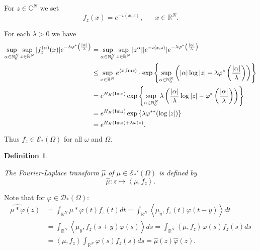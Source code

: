 \documentclass[twoside]{amsart}
\newtheorem{Def}[Th]{Definition}
\begin{document}
For
$z\in\mathbb{C}^{N}$ we set
\[
f_{z}(x)=e^{-i\left\langle x,z\right\rangle },\,\,\,\,\,\,\,\,\,\,x\in{\mathbb R}^N.
\]

For each $\lambda>0$ we have 
\begin{align}
 \sup_{\alpha\in{\mathbb N}_0^N}\sup_{x\in{\mathbb R}^N}
  |f_{z}^{(\alpha)}(x)|e^{-\lambda\varphi^*\left(\frac{|\alpha|}{\lambda}\right)}
  & =\sup_{\alpha\in{\mathbb N}_0^N}\sup_{x\in{\mathbb R}^N}
  |z^{\alpha}|
  |e^{-i\left\langle x,z\right\rangle }|e^{-\lambda\varphi^*\left(\frac{|\alpha|}{\lambda}\right)}
  \nonumber \\
  & \leq\sup_{x\in{\mathbb R}^N}e^{\langle
      x,{\mathop{\rm Im}\nolimits} z\rangle} \cdot\exp\left\{\sup_{\alpha\in{\mathbb N}_{0}^{N}}
      \left(|\alpha|\log|z|-\lambda\varphi^{*}\left(\frac{|\alpha|}{\lambda}
      \right)\right)\right\}\nonumber \\
  & =e^{H_{K}({\mathop{\rm Im}\nolimits} z)}\exp\left\{ \sup_{\alpha\in{\mathbb N}_{0}^{N}}\lambda
  \left(\frac{|\alpha|}{\lambda}\log|z|-\varphi^{*}\left(
  \frac{|\alpha|}{\lambda}\right)\right)\right\} \nonumber \\
 & =e^{H_{K}({\mathop{\rm Im}\nolimits} z)}\exp\left\{ \lambda\varphi^{**}(\log|z|)\right\} \nonumber \\
   & =e^{H_{K}({\mathop{\rm Im}\nolimits} z)+\lambda\omega(z)}.
  \label{eq:AA}
\end{align}
Thus $f_{z}\in{\mathcal{E}}_*(\Omega)$ for all $\omega$ and $\Omega$.

\begin{Def}
  \begin{em}
The {\em Fourier-Laplace transform} $\hat{\mu}$ of $\mu\in{\mathcal{E}}_*'(\Omega)$
is defined by
\[
\hat{\mu}:z\mapsto\left\langle \mu,f_{z}\right\rangle .
\]
  \end{em}
\end{Def}

Note that for $\varphi\in{\mathcal{D}}_*(\Omega):$
\begin{align*}
\widehat{\mu*\varphi}(z) & =\int_{{\mathbb R}^N}\mu*\varphi(t)f_{z}(t)dt
  =\int_{{\mathbb R}^N}\left\langle \mu_{y},f_{z}(t)\varphi(t-y)\right\rangle dt\\
 & =\int_{{\mathbb R}^N}\left\langle \mu_{y},f_{z}(s+y)\varphi(s)\right\rangle ds
  =\int_{{\mathbb R}^N}\left\langle \mu,f_{z}\right\rangle \varphi(s)f_{z}(s)ds\\
 & =\left\langle \mu,f_{z}\right\rangle \int_{{\mathbb R}^N}\varphi(s)f_{z}(s)ds
  =\hat{\mu}(z)\hat{\varphi}(z).
\end{align*}
\end{document}
